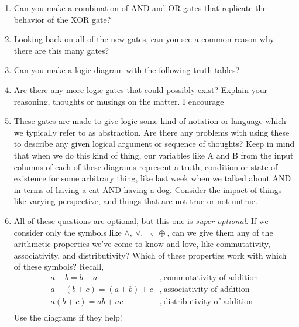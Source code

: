 \begin{enumerate}
    \item Can you make a combination of AND and OR gates that replicate the behavior of the XOR gate?
    \item Looking back on all of the new gates, can you see a common reason why there are this many gates?
    \item Can you make a logic diagram with the following truth tables?
    \item Are there any more logic gates that could possibly exist? Explain your reasoning, thoughts or musings on the matter. I encourage
    \item These gates are made to give logic some kind of notation or language which we typically refer to as abstraction. Are there any problems
        with using these to describe any given logical argument or sequence of thoughts? Keep in mind that when we do this kind of thing, our variables
        like A and B from the input columns of each of these diagrams represent a truth, condition or state of existence for some arbitrary thing, like
        last week when we talked about AND in terms of having a cat AND having a dog. Consider the impact of things like varying perspective, and things
        that are not true or not untrue.
        \newpage
    \item All of these questions are optional, but this one is \textit{super optional}. If we consider only the symbols like $\land,\ \lor,\ \neg,\ \oplus$,
        can we give them any of the arithmetic properties we've come to know and love, like commutativity, associativity, and distributivity? Which of
        these properties work with which of these symbols? Recall,
        \begin{align*}
            a+b=b+a&,\ \text{commutativity of addition}\\
            a+(b+c)=(a+b)+c&,\ \text{associativity of addition}\\
            a(b+c)=ab+ac&,\ \text{distributivity of addition}\\
        \end{align*}
        Use the diagrams if they help!
\end{enumerate}



